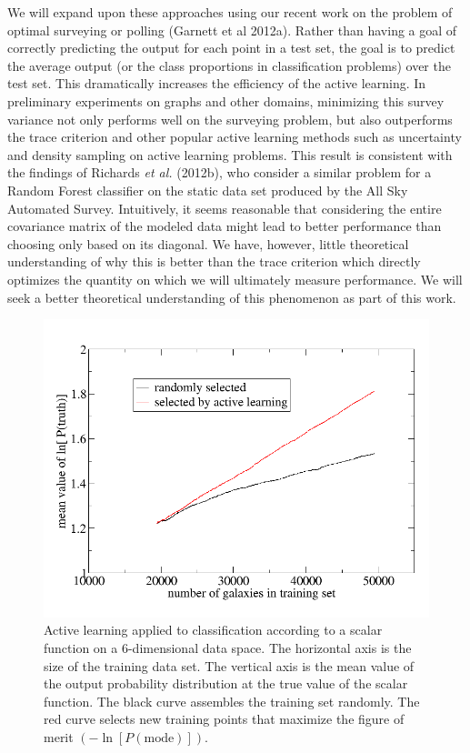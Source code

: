\documentclass[useAMS,usenatbib,tightenlines,11pt,preprint]{aastex}
\begin{document}
We will expand upon these approaches using
our recent work on the problem of optimal surveying or polling
(Garnett et al 2012a).  Rather than having a goal of correctly
predicting the output for each point in a test set, the goal is to
predict the average output (or the class proportions in classification
problems) over the test set.  This dramatically increases the
efficiency of the active learning.  In preliminary experiments on
graphs and other domains, minimizing this survey variance not only
performs well on the surveying problem, but also outperforms the trace
criterion and other popular active learning methods such as
uncertainty and density sampling on active learning problems.
This result is consistent with the findings of Richards {\it et al.} (2012b),
who consider a similar problem for a Random Forest classifier on 
the static data set produced by the All Sky Automated Survey.
Intuitively, it seems reasonable that considering the entire
covariance matrix of the modeled data
might lead to better performance than choosing only
based on its diagonal.  We have, however, little theoretical understanding of
why this is better than the trace criterion which directly optimizes
the quantity on which we will ultimately measure performance.  We will
seek a better theoretical understanding of this phenomenon as part of
this work.

\begin{figure}
\centerline{
\includegraphics[scale=0.3]{learning_curve.png}
}
\caption{
Active learning applied to classification according to a scalar function on a
6-dimensional data space.  The horizontal axis is the size of the training data
set.  The vertical axis is the mean value of the output probability distribution
at the true value of the scalar function.  The black curve assembles the
training set randomly.  The red curve selects new training points that maximize
the figure of merit $\left(-\ln[P(\text{mode})]\right)$.
}
\label{fig:learning}
\end{figure}
\end{document}
